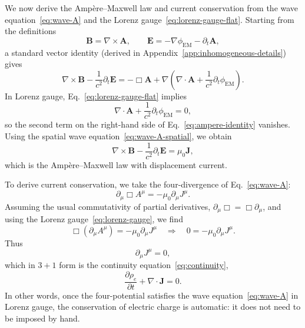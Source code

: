 \documentclass[11pt]{article}
\begin{document}
We now derive the Amp\`ere--Maxwell law and current conservation from the wave equation~\eqref{eq:wave-A} and the Lorenz gauge~\eqref{eq:lorenz-gauge-flat}.  Starting from the definitions
\begin{equation}
\mathbf{B} = \nabla\times\mathbf{A},
\qquad
\mathbf{E} = -\nabla\phi_{\mathrm{EM}} - \partial_t \mathbf{A},
\end{equation}
a standard vector identity (derived in Appendix~\ref{app:inhomogeneous-details}) gives
\begin{equation}
\nabla\times\mathbf{B}
- \frac{1}{c^2}\partial_t \mathbf{E}
= -\Box \mathbf{A}
+ \nabla\!\left(\nabla\cdot\mathbf{A}
               + \frac{1}{c^2}\partial_t \phi_{\mathrm{EM}}\right).
\label{eq:ampere-identity}
\end{equation}
In Lorenz gauge, Eq.~\eqref{eq:lorenz-gauge-flat} implies
\begin{equation}
\nabla\cdot\mathbf{A}
+ \frac{1}{c^2}\partial_t \phi_{\mathrm{EM}} = 0,
\end{equation}
so the second term on the right-hand side of Eq.~\eqref{eq:ampere-identity} vanishes.  Using the spatial wave equation~\eqref{eq:wave-A-spatial}, we obtain
\begin{equation}
\nabla\times\mathbf{B}
- \frac{1}{c^2}\partial_t \mathbf{E}
= \mu_0 \mathbf{J},
\label{eq:ampere-maxwell}
\end{equation}
which is the Amp\`ere--Maxwell law with displacement current.

To derive current conservation, we take the four-divergence of Eq.~\eqref{eq:wave-A}:
\begin{equation}
\partial_\mu \Box A^\mu
= -\mu_0 \partial_\mu J^\mu.
\end{equation}
Assuming the usual commutativity of partial derivatives, $\partial_\mu \Box = \Box \partial_\mu$, and using the Lorenz gauge~\eqref{eq:lorenz-gauge}, we find
\begin{equation}
\Box(\partial_\mu A^\mu) = -\mu_0 \partial_\mu J^\mu
\quad\Longrightarrow\quad
0 = -\mu_0 \partial_\mu J^\mu.
\end{equation}
Thus
\begin{equation}
\partial_\mu J^\mu = 0,
\end{equation}
which in $3+1$ form is the continuity equation~\eqref{eq:continuity},
\begin{equation}
\frac{\partial \rho_e}{\partial t} + \nabla\cdot\mathbf{J} = 0.
\end{equation}
In other words, once the four-potential satisfies the wave equation~\eqref{eq:wave-A} in Lorenz gauge, the conservation of electric charge is automatic: it does not need to be imposed by hand.
\end{document}
